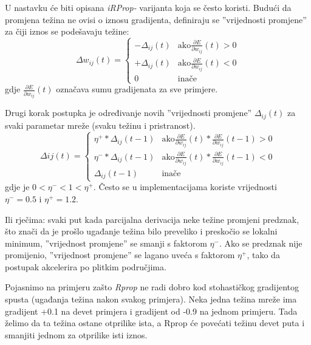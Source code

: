 \documentclass[times, utf8, diplomski, numeric]{fer}
\begin{document}
U nastavku će biti opisana \textit{iRProp-} varijanta \cite{Igel00} koja se često koristi. Budući da promjena težina ne ovisi o iznosu gradijenta, definiraju se ''vrijednosti promjene'' za čiji iznos se podešavaju težine:
\begin{equation}
  \Delta w_{ij}(t) =
    \left\{
	    \begin{array}{ll}
		    -\Delta_{ij}(t)  & \mbox{ako} \frac{\partial E}{\partial w_{ij}}(t) > 0 \\
		    +\Delta_{ij}(t)  & \mbox{ako} \frac{\partial E}{\partial w_{ij}}(t) < 0\\
		    0  & \mbox{inače}
	    \end{array}
    \right.
\end{equation}
gdje $\frac{\partial E}{\partial w_{ij}}(t)$ označava sumu gradijenata za sve primjere.

Drugi korak postupka je određivanje novih ''vrijednosti promjene'' $\Delta_{ij}(t)$ za svaki parametar mreže (svaku težinu i pristranost).
\begin{equation}
  \Delta{ij}(t) =
    \left\{
	    \begin{array}{ll}
		    \eta^{+} * \Delta_{ij}(t-1)  & \mbox{ako} \frac{\partial E}{\partial w_{ij}}(t) * \frac{\partial E}{\partial w_{ij}}(t-1) > 0 \\
		    \eta^{-} * \Delta_{ij}(t-1)  & \mbox{ako} \frac{\partial E}{\partial w_{ij}}(t) * \frac{\partial E}{\partial w_{ij}}(t-1) < 0\\
		    \Delta_{ij}(t-1)  & \mbox{inače}
	    \end{array}
    \right.
\end{equation}
gdje je $0 < \eta^{-} < 1 < \eta^{+}$. Često se u implementacijama koriste vrijednosti $\eta^{-} = 0.5$ i $\eta^{+} = 1.2$.

Ili rječima: svaki put kada parcijalna derivacija neke težine promjeni predznak, što znači da je prošlo ugađanje težina bilo preveliko i preskočio se lokalni minimum, ''vrijednost promjene'' se smanji s faktorom $\eta^{-}$. Ako se predznak nije promijenio, ''vrijednost promjene'' se lagano uveća s faktorom $\eta^{+}$, tako da postupak akcelerira po plitkim područjima.

Pojasnimo na primjeru zašto \textit{Rprop} ne radi dobro kod stohastičkog gradijentog spusta (ugađanja težina nakon svakog primjera). Neka jedna težina mreže ima gradijent +0.1 na devet primjera i gradijent od -0.9 na jednom primjeru. Tada želimo da ta težina ostane otprilike ista, a Rprop će povećati težinu devet puta i smanjiti jednom za otprilike isti iznos.
\end{document}
